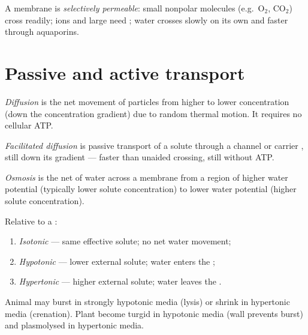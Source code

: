 \begin{definition}\label{def:g10:membranes-enzymes:perm}
A membrane is \emph{selectively permeable}:
small nonpolar molecules (e.g.\ $\mathrm{O_2}$, $\mathrm{CO_2}$) cross
readily; ions and large  need ; water crosses
slowly on its own and faster through aquaporins.
\end{definition}

\section{Passive and active transport}

\begin{definition}[Diffusion]\label{def:g10:membranes-enzymes:diffusion}
\emph{Diffusion} is the net movement of particles from
higher to lower concentration (down the concentration gradient) due to
random thermal motion. It requires no cellular ATP.
\end{definition}

\begin{definition}\label{def:g10:membranes-enzymes:facilitated}
\emph{Facilitated diffusion} is passive
transport of a solute through a channel or carrier , still down
its gradient --- faster than unaided crossing, still without ATP.
\end{definition}

\begin{definition}[Osmosis]\label{def:g10:membranes-enzymes:osmosis}
\emph{Osmosis} is the net  of water across a
 membrane from a region of higher water potential
(typically lower solute concentration) to lower water potential (higher
solute concentration).
\end{definition}

\begin{definition}[Tonicity]\label{def:g10:membranes-enzymes:tonicity}
Relative to a :
\begin{enumerate}
  \item \emph{Isotonic} --- same effective solute;
        no net water movement;
  \item \emph{Hypotonic} --- lower external solute;
        water enters the ;
  \item \emph{Hypertonic} --- higher external solute;
        water leaves the .
\end{enumerate}
Animal  may burst in strongly hypotonic media (lysis) or shrink in
hypertonic media (crenation). Plant  become turgid in hypotonic
media (wall prevents burst) and plasmolysed in hypertonic media.
\end{definition}

